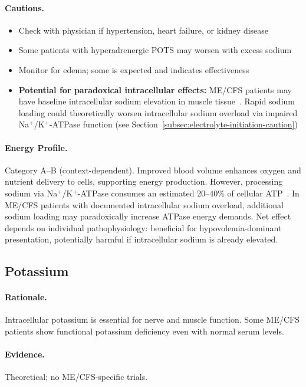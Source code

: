 \paragraph{Cautions.}
\begin{itemize}
    \item Check with physician if hypertension, heart failure, or kidney disease
    \item Some patients with hyperadrenergic POTS may worsen with excess sodium
    \item Monitor for edema; some is expected and indicates effectiveness
    \item \textbf{Potential for paradoxical intracellular effects:} ME/CFS patients may have baseline intracellular sodium elevation in muscle tissue~\cite{Petter2022sodium}. Rapid sodium loading could theoretically worsen intracellular sodium overload via impaired Na$^+$/K$^+$-ATPase function (see Section~\ref{subsec:electrolyte-initiation-caution})
\end{itemize}

\paragraph{Energy Profile.}
Category A--B (context-dependent). Improved blood volume enhances oxygen and nutrient delivery to cells, supporting energy production. However, processing sodium via Na$^+$/K$^+$-ATPase consumes an estimated 20--40\% of cellular ATP~\cite{Wirth2021muscle}. In ME/CFS patients with documented intracellular sodium overload, additional sodium loading may paradoxically increase ATPase energy demands. Net effect depends on individual pathophysiology: beneficial for hypovolemia-dominant presentation, potentially harmful if intracellular sodium is already elevated.

\subsection{Potassium}

\paragraph{Rationale.} Intracellular potassium is essential for nerve and muscle function. Some ME/CFS patients show functional potassium deficiency even with normal serum levels.

\paragraph{Evidence.} Theoretical; no ME/CFS-specific trials.

